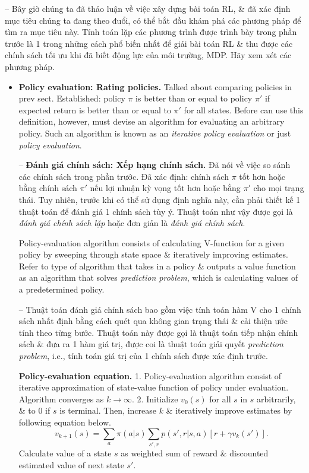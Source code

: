 \documentclass{article}
\begin{document}
\begin{itemize}
\begin{itemize}
        -- Bây giờ chúng ta đã thảo luận về việc xây dựng bài toán RL, \& đã xác định mục tiêu chúng ta đang theo đuổi, có thể bắt đầu khám phá các phương pháp để tìm ra mục tiêu này. Tính toán lặp các phương trình được trình bày trong phần trước là 1 trong những cách phổ biến nhất để giải bài toán RL \& thu được các chính sách tối ưu khi đã biết động lực của môi trường, MDP. Hãy xem xét các phương pháp.
        \begin{itemize}
            \item {\bf Policy evaluation: Rating policies.} Talked about comparing policies in prev sect. Established: policy $\pi$ is better than or equal to policy $\pi'$ if expected return is better than or equal to $\pi'$ for all states. Before can use this definition, however, must devise an algorithm for evaluating an arbitrary policy. Such an algorithm is known as an {\it iterative policy evaluation} or just {\it policy evaluation}.

            -- {\bf Đánh giá chính sách: Xếp hạng chính sách.} Đã nói về việc so sánh các chính sách trong phần trước. Đã xác định: chính sách $\pi$ tốt hơn hoặc bằng chính sách $\pi'$ nếu lợi nhuận kỳ vọng tốt hơn hoặc bằng $\pi'$ cho mọi trạng thái. Tuy nhiên, trước khi có thể sử dụng định nghĩa này, cần phải thiết kế 1 thuật toán để đánh giá 1 chính sách tùy ý. Thuật toán như vậy được gọi là {\it đánh giá chính sách lặp} hoặc đơn giản là {\it đánh giá chính sách}.

            Policy-evaluation algorithm consists of calculating V-function for a given policy by sweeping through state space \& iteratively improving estimates. Refer to type of algorithm that takes in a policy \& outputs a value function as an algorithm that solves {\it prediction problem}, which is calculating values of a predetermined policy.

            -- Thuật toán đánh giá chính sách bao gồm việc tính toán hàm V cho 1 chính sách nhất định bằng cách quét qua không gian trạng thái \& cải thiện ước tính theo từng bước. Thuật toán này được gọi là thuật toán tiếp nhận chính sách \& đưa ra 1 hàm giá trị, được coi là thuật toán giải quyết {\it prediction problem}, i.e., tính toán giá trị của 1 chính sách được xác định trước.

            {\bf Policy-evaluation equation.} 1. Policy-evaluation algorithm consist of iterative approximation of state-value function of policy under evaluation. Algorithm converges as $k\to\infty$. 2. Initialize $v_0(s)$ for all $s$ in $s$ arbitrarily, \& to 0 if $s$ is terminal. Then, increase $k$ \& iteratively improve estimates by following equation below.
            \begin{equation*}
                v_{k+1}(s) = \sum_a \pi(a|s)\sum_{s',r} p(s',r|s,a)[r + \gamma v_k(s')].
            \end{equation*}
            Calculate value of a state $s$ as weighted sum of reward \& discounted estimated value of next state $s'$.


\end{itemize}
\end{itemize}
\end{itemize}
\end{document}
